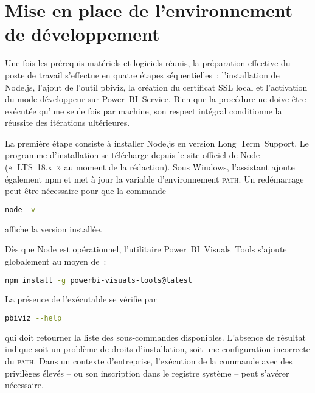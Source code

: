 
\section{Mise en place de l’environnement de développement}\label{sec:ch4_setup_env}

Une fois les prérequis matériels et logiciels réunis, la préparation effective du poste de travail s’effectue en quatre étapes séquentielles : l’installation de Node.js, l’ajout de l’outil pbiviz, la création du certificat SSL local et l’activation du mode développeur sur Power BI Service. Bien que la procédure ne doive être exécutée qu’une seule fois par machine, son respect intégral conditionne la réussite des itérations ultérieures.

La première étape consiste à installer Node.js en version Long Term Support. Le programme d’installation se télécharge depuis le site officiel de Node (« LTS 18.x » au moment de la rédaction). Sous Windows, l’assistant ajoute également npm et met à jour la variable d’environnement \textsc{path}. Un redémarrage peut être nécessaire pour que la commande
\begin{lstlisting}[language=bash]
node -v
\end{lstlisting}
affiche la version installée.

Dès que Node est opérationnel, l’utilitaire Power BI Visuals Tools s’ajoute globalement au moyen de :
\begin{lstlisting}[language=bash]
npm install -g powerbi-visuals-tools@latest
\end{lstlisting}
La présence de l’exécutable se vérifie par
\begin{lstlisting}[language=bash]
pbiviz --help
\end{lstlisting}
qui doit retourner la liste des sous‑commandes disponibles. L’absence de résultat indique soit un problème de droits d’installation, soit une configuration incorrecte du \textsc{path}. Dans un contexte d’entreprise, l’exécution de la commande avec des privilèges élevés – ou son inscription dans le registre système – peut s’avérer nécessaire.

